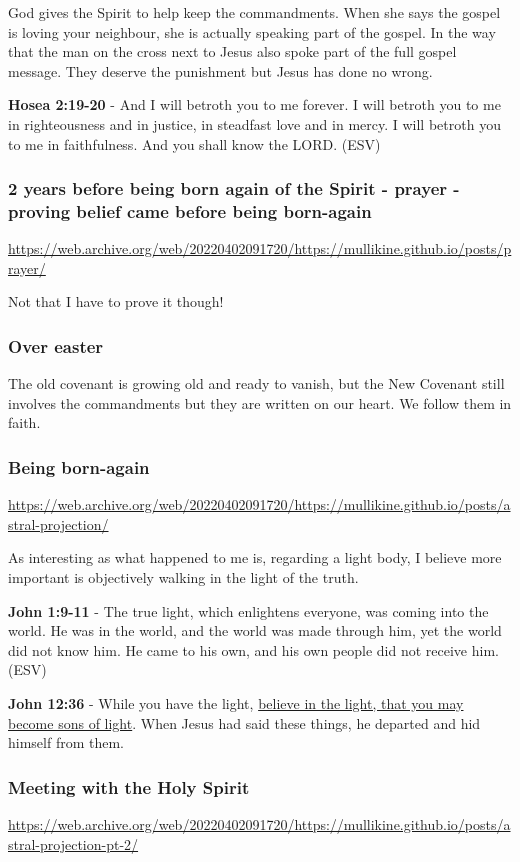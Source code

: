 \documentclass[11pt]{article}
\begin{document}
God gives the Spirit to help keep the commandments. When she says the gospel is loving your neighbour, she is actually speaking part of the gospel. In the way that the man on the cross next to Jesus also spoke part of the full gospel message. They deserve the punishment but Jesus has done no wrong.

\textbf{Hosea 2:19-20} - And I will betroth you to me forever. I will betroth you to me in righteousness and in justice, in steadfast love and in mercy. I will betroth you to me in faithfulness. And you shall know the LORD. (ESV)

\subsubsection{2 years before being born again of the Spirit - prayer - proving belief came before being born-again}
\label{sec:org4ebf503}
\url{https://web.archive.org/web/20220402091720/https://mullikine.github.io/posts/prayer/}

Not that I have to prove it though!

\subsubsection{Over easter}
\label{sec:org0cac969}
The old covenant is growing old and ready to vanish, but the New Covenant still involves the commandments but they are written on our heart.
We follow them in faith.

\subsubsection{Being born-again}
\label{sec:org5be8570}
\url{https://web.archive.org/web/20220402091720/https://mullikine.github.io/posts/astral-projection/}

As interesting as what happened to me is, regarding a light body, I believe more important is objectively walking in the light of the truth.

\textbf{John 1:9-11} - The true light, which enlightens everyone, was coming into the world. He was in the world, and the world was made through him, yet the world did not know him. He came to his own, and his own people did not receive him. (ESV)

\textbf{John 12:36} - While you have the light, \uline{believe in the light, that you may become sons of light}. When Jesus had said these things, he departed and hid himself from them.

\subsubsection{Meeting with the Holy Spirit}
\label{sec:orgc34b9a2}
\url{https://web.archive.org/web/20220402091720/https://mullikine.github.io/posts/astral-projection-pt-2/}
\end{document}
